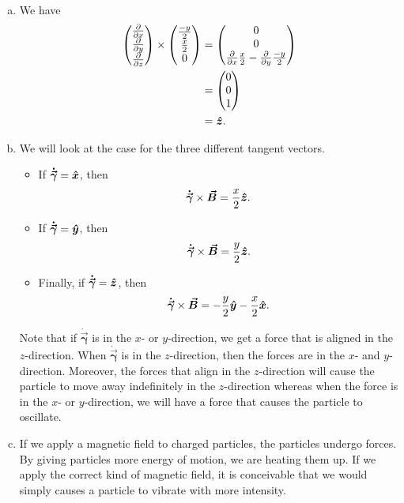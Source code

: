 \documentclass[12pt]{article} %
\newcommand{\tangentgamma}{\boldsymbol{\dot{\vec{\gamma}}}}
\newcommand{\vecfieldB}{\boldsymbol{\vec{B}}}
\begin{document}
\begin{solution}~
\begin{enumerate}[(a)]
    \item We have
    \begin{align*}
        \begin{pmatrix} \frac{\partial}{\partial x} \\ \frac{\partial}{\partial y} \\ \frac{\partial}{\partial z} \end{pmatrix} \times \begin{pmatrix} \frac{-y}{2} \\ \frac{x}{2} \\ 0 \end{pmatrix} &= \begin{pmatrix} 0 \\ 0 \\   \frac{\partial}{\partial x} \frac{x}{2} - \frac{\partial}{\partial y} \frac{-y}{2} \end{pmatrix} \\
                &= \begin{pmatrix} 0 \\ 0 \\ 1 \end{pmatrix}\\
                &= \boldsymbol{\hat{z}}.
    \end{align*}
    \item We will look at the case for the three different tangent vectors.
    \begin{itemize} 
        \item If $\tangentgamma = \xhat$, then
        \[
        \tangentgamma \times \vecfieldB = \frac{x}{2}\zhat.
        \]
        \item If $\tangentgamma = \yhat$, then
        \[
        \tangentgamma \times \vecfieldB = \frac{y}{2} \zhat.
        \]
        \item Finally, if $\tangentgamma =\zhat$, then
        \[
        \tangentgamma \times \vecfieldB = -\frac{y}{2}\yhat -\frac{x}{2}\xhat.
        \]
    \end{itemize}
    Note that if $\tangentgamma$ is in the $x$- or $y$-direction, we get a force that is aligned in the $z$-direction.  When $\tangentgamma$ is in the $z$-direction, then the forces are in the $x$- and $y$-direction. Moreover, the forces that align in the $z$-direction will cause the particle to move away indefinitely in the $z$-direction whereas when the force is in the $x$- or $y$-direction, we will have a force that causes the particle to oscillate.
    
    \item If we apply a magnetic field to charged particles, the particles undergo forces. By giving particles more energy of motion, we are heating them up.  If we apply the correct kind of magnetic field, it is conceivable that we would simply causes a particle to vibrate with more intensity.
\end{enumerate}
\end{solution}
\end{document}
